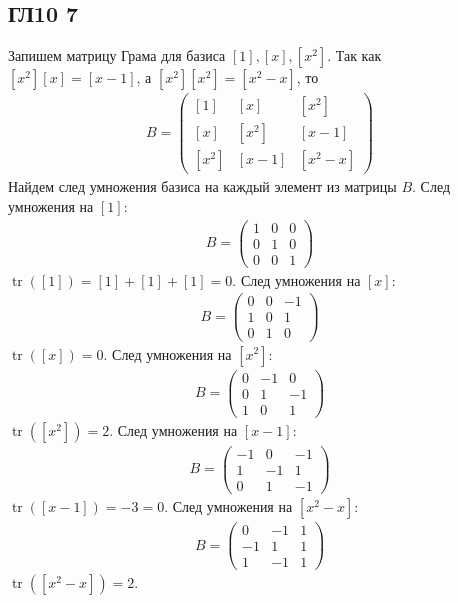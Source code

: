 \subsection*{ГЛ10 7}
Запишем матрицу Грама для базиса $[1], [x], [x^2]$. Так как $[x^2][x] = [x-1]$, а $[x^2][x^2] = [x^2-x]$, то
\begin{gather*}
	B = 
	\begin{pmatrix}
		[1] & [x] & [x^2] \\
		[x] & [x^2] & [x-1] \\
		[x^2] & [x-1] & [x^2-x]
	\end{pmatrix} 
\end{gather*}
Найдем след умножения базиса на каждый элемент из матрицы $B$. След умножения на $[1]$:
\begin{gather*}
	B = 
	\begin{pmatrix}
		1 & 0 & 0 \\
		0 & 1 & 0 \\
		0 & 0 & 1
	\end{pmatrix} 
\end{gather*}
$\operatorname{tr}([1])=[1]+[1]+[1]=0$. След умножения на $[x]$:
\begin{gather*}
	B = 
	\begin{pmatrix}
		0 & 0 & -1 \\
		1 & 0 & 1 \\
		0 & 1 & 0
	\end{pmatrix} 
\end{gather*}
$\operatorname{tr}([x]) = 0$. След умножения на $[x^2]$:
\begin{gather*}
	B = 
	\begin{pmatrix}
		0 & -1 & 0 \\
		0 & 1 & -1 \\
		1 & 0 & 1
	\end{pmatrix} 
\end{gather*}
$\operatorname{tr}([x^2]) = 2$. След умножения на $[x-1]$:
\begin{gather*}
	B =
	\begin{pmatrix}
		-1 & 0 & -1 \\
		1 & -1 & 1 \\
		0 & 1 & -1
	\end{pmatrix} 
\end{gather*}
$\operatorname{tr}([x-1]) = -3 = 0$. След умножения на $[x^2-x]$:
\begin{gather*}
	B = 
	\begin{pmatrix}
		0 & -1 & 1 \\
		-1 & 1 & 1 \\
		1 & -1 & 1
	\end{pmatrix}
\end{gather*}
$\operatorname{tr}([x^2-x]) = 2$. 

